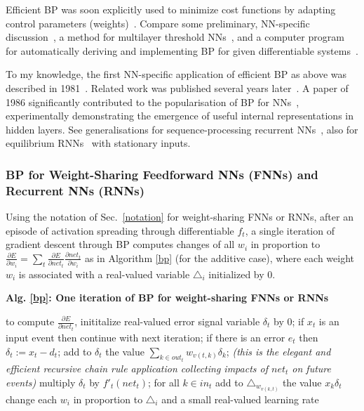 \documentclass[letterpaper]{article}
\begin{document}
\begin{sloppypar}
Efficient BP was soon explicitly used to minimize cost functions by
adapting control parameters (weights)~\citep{dreyfus:1973}.
Compare some preliminary, NN-specific discussion~\citep[section 5.5.1]{Werbos:74}, 
a method for multilayer threshold NNs~\citep{bobrowski78},
and a computer program for automatically deriving and implementing BP 
for given differentiable systems~\citep{SPEELPENNING80A}.


To my knowledge, the first NN-specific application of
efficient BP as above was described in 1981~\citep{Werbos:81sensitivity,werbos2006backwards}.
Related work was published several  years later~\citep{Parker:85,LeCun:85,lecun-88}.
A paper of 1986 significantly contributed to the popularisation of BP for NNs~\citep{Rumelhart:86}, experimentally demonstrating the emergence of useful 
internal representations in hidden layers. 
See generalisations for sequence-processing 
recurrent NNs~\citep[e.g.,][]{Williams:89,RobinsonFallside:87tr,Werbos:88gasmarket,WilliamsZipser:88,WilliamsZipser:89nc,WilliamsZipser:89cs,Rohwer:89,Pearlmutter:89,Gherrity:89,WilliamsPeng:90,Schmidhuber:92ncn3,Pearlmutter:95,baldi95,kremer2001,atiya2000}, also for equilibrium RNNs~\citep{Almeida:87,Pineda:87} with stationary inputs.

\subsubsection{BP for Weight-Sharing Feedforward NNs (FNNs) and Recurrent NNs (RNNs)}
\label{bpsec}

Using the notation of Sec.~\ref{notation} for weight-sharing FNNs or RNNs, 
after an episode of activation spreading through differentiable $f_t$, 
a single iteration of gradient descent through BP computes
changes of all $w_i$ in proportion to 
$
\frac{\partial E}{\partial w_i}=
\sum_t
\frac{\partial E}{\partial net_t}
\frac{\partial net_t}{\partial w_i}
$ 
as in Algorithm \ref{bp} (for the additive case),
where each weight $w_i$ is associated with a real-valued variable $\triangle_i$ initialized by 0.

\begin{algorithm}{\bf Alg. \ref{bp}: One iteration  of BP for weight-sharing FNNs or RNNs} 
\label{bp}
\begin{algorithmic}
\STATE to compute $\frac{\partial E}{\partial net_t}$, inititalize real-valued error signal variable $\delta_t$ by 0;
\STATE if $x_t$ is an input event then continue with next iteration;
\STATE if there is an error $e_t$ then $\delta_t := x_t-d_t$;
\STATE add to $\delta_t$ the value $\sum_{k \in out_t}  w_{v(t,k)} \delta_k$;
{\em (this is the elegant and efficient recursive chain rule
application collecting impacts of $net_t$ on future events)} 
\STATE multiply  $\delta_t$ by $f'_t(net_t)$;
\STATE for all $k \in in_t$ add to  $\triangle_{w_{v(k,t)}}$ the value $x_k \delta_t$
\ENDFOR
\STATE change each $w_i$ in proportion to $\triangle_i$ and a small real-valued learning rate
\end{algorithmic}
\end{algorithm}


\end{sloppypar}
\end{document}
